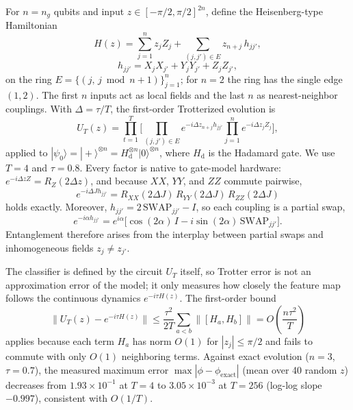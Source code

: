 \documentclass[conference]{IEEEtran}
\begin{document}
For $n=n_g$ qubits and input $z\in[-\pi/2,\pi/2]^{2n}$, define the Heisenberg-type Hamiltonian
\begin{equation}
    H(z)=\sum_{j=1}^{n}z_jZ_j+\sum_{(j,j')\in E}z_{n+j}\,h_{jj'},
    \label{eq:hamiltonian}
\end{equation}
\begin{equation}
    h_{jj'}=X_jX_{j'}+Y_jY_{j'}+Z_jZ_{j'},
\end{equation}
on the ring $E=\{(j,\,j\bmod n+1)\}_{j=1}^{n}$; for $n=2$ the ring has the single edge $(1,2)$. The first $n$ inputs act as local fields and the last $n$ as nearest-neighbor couplings. With $\Delta=\tau/T$, the first-order Trotterized evolution is
\begin{equation}
    U_T(z)=\prod_{t=1}^{T}\Bigg[\prod_{(j,j')\in E}e^{-i\Delta z_{n+j}h_{jj'}}\prod_{j=1}^{n}e^{-i\Delta z_jZ_j}\Bigg],
    \label{eq:trotter}
\end{equation}
applied to $|\psi_0\rangle=|{+}\rangle^{\otimes n}=H_{\mathrm{d}}^{\otimes n}|0\rangle^{\otimes n}$, where $H_{\mathrm{d}}$ is the Hadamard gate. We use $T=4$ and $\tau=0.8$. Every factor is native to gate-model hardware: $e^{-i\Delta z Z}=R_Z(2\Delta z)$, and because $XX$, $YY$, and $ZZ$ commute pairwise,
\begin{equation}
    e^{-i\Delta J h_{jj'}}=R_{XX}(2\Delta J)\,R_{YY}(2\Delta J)\,R_{ZZ}(2\Delta J)
\end{equation}
holds exactly. Moreover, $h_{jj'}=2\,\mathrm{SWAP}_{jj'}-I$, so each coupling is a partial swap,
\begin{equation}
    e^{-i\alpha h_{jj'}}=e^{i\alpha}\big[\cos(2\alpha)\,I-i\sin(2\alpha)\,\mathrm{SWAP}_{jj'}\big].
    \label{eq:partial-swap}
\end{equation}
Entanglement therefore arises from the interplay between partial swaps and inhomogeneous fields $z_j\neq z_{j'}$.

The classifier is defined by the circuit $U_T$ itself, so Trotter error is not an approximation error of the model; it only measures how closely the feature map follows the continuous dynamics $e^{-i\tau H(z)}$. The first-order bound~\cite{lloyd1996,childs2021trotter}
\begin{equation}
    \big\|U_T(z)-e^{-i\tau H(z)}\big\|\le\frac{\tau^2}{2T}\sum_{a<b}\big\|[H_a,H_b]\big\|=O\!\left(\frac{n\tau^2}{T}\right)
    \label{eq:trotter-error}
\end{equation}
applies because each term $H_a$ has norm $O(1)$ for $|z_j|\le\pi/2$ and fails to commute with only $O(1)$ neighboring terms. Against exact evolution ($n=3$, $\tau=0.7$), the measured maximum error $\max|\phi-\phi_{\mathrm{exact}}|$ (mean over 40 random $z$) decreases from $1.93\times10^{-1}$ at $T=4$ to $3.05\times10^{-3}$ at $T=256$ (log-log slope $-0.997$), consistent with $O(1/T)$.
\end{document}
